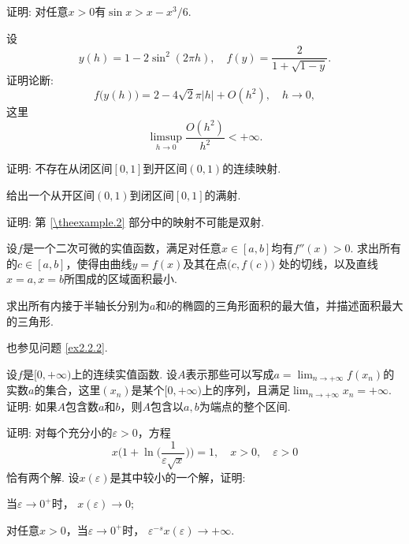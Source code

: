 \begin{example}
  证明: 对任意$x>0$有$\sin x>x-x^3/6$.
\end{example}

\begin{example}
  设
  \[ y(h)=1-2\sin^2(2\pi h),\quad f(y)=\frac2{1+\sqrt{1-y}}. \]
  证明论断:
  \[f\big(y(h)\big) = 2 - 4\sqrt2\pi|h| + O(h^2),\quad h\to0,\]
  这里
  \[ \limsup_{h\to0}\frac{O(h^2)}{h^2} < +\infty. \]
\end{example}

\begin{example}
  \begin{enuma}
    \item 证明: 不存在从闭区间$[0,1]$到开区间$(0,1)$的连续映射.
    \item 给出一个从开区间$(0,1)$到闭区间$[0,1]$的满射.
    \item 证明: 第 \ref{\theexample.2} 部分中的映射不可能是双射.
  \end{enuma}
\end{example}

\begin{example}
  设$f$是一个二次可微的实值函数，满足对任意$x\in[a,b]$均有$f''(x)>0$. 求出所有的$c\in[a,b]$，使得由曲线$y=f(x)$及其在点$\big(c,f(c)\big)$ 处的切线，以及直线$x=a,x=b$所围成的区域面积最小.
\end{example}

\begin{example}
  求出所有内接于半轴长分别为$a$和$b$的椭圆的三角形面积的最大值，并描述面积最大的三角形.
  \begin{note}
    也参见问题 \ref{ex2.2.2}.
  \end{note}
\end{example}

\begin{example}
  设$f$是$[0,+\infty)$上的连续实值函数. 设$A$表示那些可以写成$a=\lim_{n\to+\infty}f(x_n)$的实数$a$的集合，这里$(x_n)$是某个$[0,+\infty)$上的序列，且满足$\lim_{n\to+\infty}x_n=+\infty$. 证明: 如果$A$包含数$a$和$b$，则$A$包含以$a,b$为端点的整个区间.
\end{example}

\begin{example}
  证明: 对每个充分小的$\varepsilon>0$，方程
  \[ x\bigg( 1+\ln \Big( \frac1{\varepsilon\sqrt x} \Big) \bigg)
  =1,\quad x>0,\quad \varepsilon>0 \]
  恰有两个解. 设$x(\varepsilon)$是其中较小的一个解，证明:
  \begin{eenum}
    \item 当$\varepsilon\to0^+$时， $x(\varepsilon)\to0$;
    \item 对任意$x>0$，当$\varepsilon\to0^+$时， $\varepsilon^ {-s}x(\varepsilon)\to+\infty$.
  \end{eenum}
\end{example}

